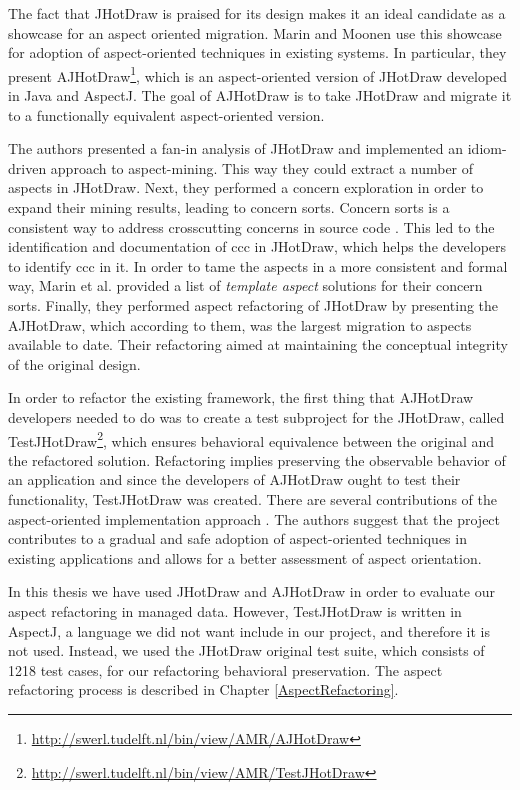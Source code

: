 The fact that JHotDraw is praised for its design makes it an ideal candidate as a showcase for an aspect oriented migration. 
Marin and Moonen \cite{marinajhotdraw} use this showcase for adoption of aspect-oriented techniques in existing systems. 
In particular, they present AJHotDraw\footnote{\url{http://swerl.tudelft.nl/bin/view/AMR/AJHotDraw}}, which is an aspect-oriented version of JHotDraw developed in Java and AspectJ. 
The goal of AJHotDraw is to take JHotDraw and migrate it to a functionally equivalent aspect-oriented version. 

The authors presented a fan-in analysis of JHotDraw \cite{marin2004identifying} and implemented an idiom-driven approach to aspect-mining. 
This way they could extract a number of aspects in JHotDraw. 
Next, they performed a concern exploration in order to expand their mining results, leading to concern sorts.
Concern sorts is a consistent way to address crosscutting concerns in source code \cite{marin2005classification}.
This led to the identification and documentation of \ac{ccc} in JHotDraw, which helps the developers to identify \ac{ccc} in it.
In order to tame the aspects in a more consistent and formal way, Marin et al. provided a list of \textit{template aspect} solutions for their concern sorts.
Finally, they performed aspect refactoring of JHotDraw by presenting the AJHotDraw, which according to them, was the largest migration to aspects available to date.
Their refactoring aimed at maintaining the conceptual integrity of the original design.

In order to refactor the existing framework, the first thing that AJHotDraw developers needed to do was to create a test subproject for the JHotDraw, called TestJHotDraw\footnote{\url{http://swerl.tudelft.nl/bin/view/AMR/TestJHotDraw}}, which ensures behavioral equivalence between the original and the refactored solution. 
Refactoring implies preserving the observable behavior of an application \cite{fowler2009refactoring} and since the developers of AJHotDraw ought to test their functionality, TestJHotDraw was created. 
There are several contributions of the aspect-oriented implementation approach \cite{marinajhotdraw}. 
The authors suggest that the project contributes to a gradual and safe adoption of aspect-oriented techniques in existing applications and allows for a better assessment of aspect orientation.

In this thesis we have used JHotDraw and AJHotDraw in order to evaluate our aspect refactoring in managed data.
However, TestJHotDraw is written in AspectJ, a language we did not want include in our project, and therefore it is not used.
Instead, we used the JHotDraw original test suite, which consists of 1218 test cases, for our refactoring behavioral preservation.
The aspect refactoring process is described in Chapter \ref{AspectRefactoring}.

